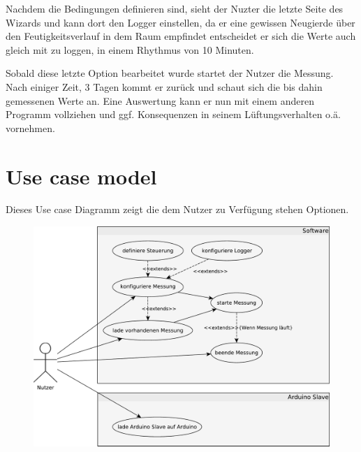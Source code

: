Nachdem die Bedingungen definieren sind, sieht der Nuzter die letzte Seite des Wizards und kann dort den Logger einstellen, da er eine gewissen Neugierde über den Feutigkeitsverlauf in dem Raum empfindet entscheidet er sich die Werte auch gleich mit zu loggen, in einem Rhythmus von 10 Minuten. 

Sobald diese letzte Option bearbeitet wurde startet der Nutzer die Messung. Nach einiger Zeit, 3 Tagen kommt er zurück und schaut sich die bis dahin gemessenen Werte an. Eine Auswertung kann er nun mit einem anderen Programm vollziehen und ggf. Konsequenzen in seinem Lüftungsverhalten o.ä. vornehmen.
\section{Use case model}
Dieses Use case Diagramm zeigt die dem Nutzer zu Verfügung stehen Optionen.
\begin{figure}[H]
 \centering
 \includegraphics[width=\textwidth, keepaspectratio=true]{../Diagramme/BachelorUseCase1.pdf}
\end{figure}

